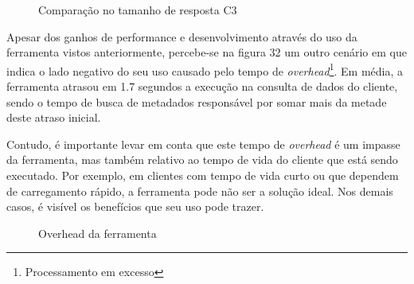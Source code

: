 \begin{figure}[H]
  \centering
  \caption{Comparação no tamanho de resposta C3}
\end{figure}

Apesar dos ganhos de performance e desenvolvimento através do uso da ferramenta vistos anteriormente, percebe-se na figura 32 um outro cenário em que indica o lado negativo do seu uso causado pelo tempo de \textit{overhead}\footnote{
  Processamento em excesso
}. Em média, a ferramenta atrasou em 1.7 segundos a execução na consulta de dados do cliente, sendo o tempo de busca de metadados responsável por somar mais da metade deste atraso inicial.

Contudo, é importante levar em conta que este tempo de \textit{overhead} é um impasse da ferramenta, mas também relativo ao tempo de vida do cliente que está sendo executado. Por exemplo, em clientes com tempo de vida curto ou que dependem de carregamento rápido, a ferramenta pode não ser a solução ideal. Nos demais casos, é visível os benefícios que seu uso pode trazer.

\begin{figure}[H]
  \centering
  \caption{Overhead da ferramenta}
\end{figure}

